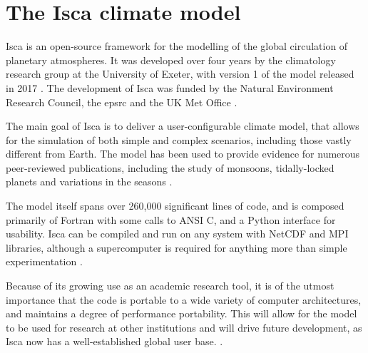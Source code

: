 \documentclass[a4paper,11pt]{report}
\begin{document}
\section{The Isca climate model}
Isca is an open-source framework for the modelling of the global circulation of planetary atmospheres. It was developed over four years by the climatology research group at the University of Exeter, with version 1 of the model released in 2017 \cite{vallis2018isca}. The development of Isca was funded by the Natural Environment Research Council, the \gls{epsrc} and the UK Met Office \cite{vallis2018isca}.
\par
The main goal of Isca is to deliver a user-configurable climate model, that allows for the simulation of both simple and complex scenarios, including those vastly different from Earth. The model has been used to provide evidence for numerous peer-reviewed publications, including the study of monsoons, tidally-locked planets and variations in the seasons  \cite{penn2017thermal, thomson2018atmospheric, geen2018regime}.
 \par
 The model itself spans over 260,000 significant lines of code, and is composed primarily of Fortran with some calls to ANSI C, and a Python interface for usability. Isca can be compiled and run on any system with NetCDF and MPI libraries, although a supercomputer is required for anything more than simple experimentation \cite{vallis2018isca}. 
 \par
Because of its growing use as an academic research tool, it is of the utmost importance that the code is portable to a wide variety of computer architectures, and maintains a degree of performance portability. This will allow for the model to be used for research at other institutions and will drive future development, as Isca now has a well-established global user base. .
\end{document}
